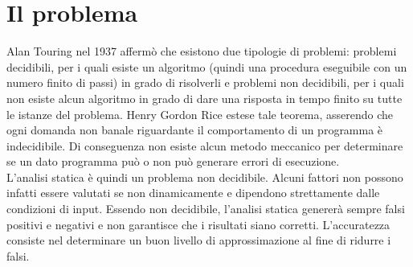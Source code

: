 \section{Il problema}
Alan Touring\cite{turing} nel 1937 affermò che esistono due tipologie di problemi: problemi decidibili, per i quali esiste un algoritmo (quindi una procedura eseguibile con un numero finito di passi) in grado di risolverli e problemi non decidibili, per i quali non esiste alcun algoritmo in grado di dare una risposta in tempo finito su tutte le istanze del problema. Henry Gordon Rice estese tale teorema\cite{rice}, asserendo che ogni domanda non banale riguardante il comportamento di un programma è indecidibile. Di conseguenza non esiste alcun metodo meccanico per determinare se un dato programma può o non può generare errori di esecuzione.\\
L'analisi statica è quindi un problema non decidibile. Alcuni fattori non possono infatti essere valutati se non dinamicamente e dipendono strettamente dalle condizioni di input. Essendo non decidibile, l'analisi statica genererà sempre falsi positivi e negativi e non garantisce che i risultati siano corretti. L'accuratezza consiste nel determinare un buon livello di approssimazione al fine di ridurre i falsi.

